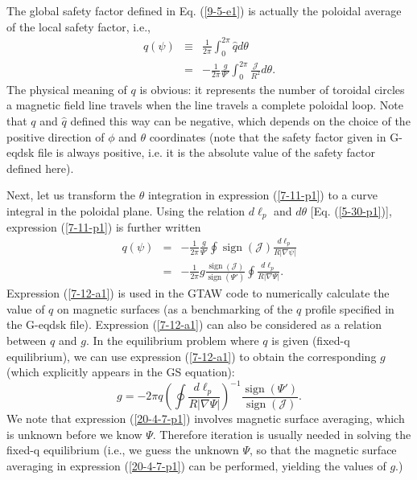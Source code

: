 \documentclass{article}
\newcommand{\tmop}[1]{\ensuremath{\operatorname{#1}}}
\begin{document}
The global safety factor defined in Eq. (\ref{9-5-e1}) is actually the
poloidal average of the local safety factor, i.e.,
\begin{eqnarray}
  q (\psi) & \equiv & \frac{1}{2 \pi} \int_0^{2 \pi} \hat{q} d \theta 
  \label{4-10-p5}\\
  & = & - \frac{1}{2 \pi}  \frac{g}{\Psi'} \int_0^{2 \pi}
  \frac{\mathcal{J}}{R^2} d \theta .  \label{7-11-p1}
\end{eqnarray}
The physical meaning of $q$ is obvious: it represents the number of toroidal
circles a magnetic field line travels when the line travels a complete
poloidal loop. Note that $q$ and $\hat{q}$ defined this way can be negative,
which depends on the choice of the positive direction of $\phi$ and $\theta$
coordinates (note that the safety factor given in G-eqdsk file is always
positive, i.e. it is the absolute value of the safety factor defined here).

Next, let us transform the $\theta$ integration in expression (\ref{7-11-p1})
to a curve integral in the poloidal plane. Using the relation $d \ell_p$ and
$d \theta$ [Eq. (\ref{5-30-p1})], expression (\ref{7-11-p1}) is further
written
\begin{eqnarray}
  q (\psi) & = & - \frac{1}{2 \pi}  \frac{g}{\Psi'} \oint \tmop{sign}
  (\mathcal{J}) \frac{d \ell_p}{R | \nabla \psi |} \nonumber\\
  & = & - \frac{1}{2 \pi} g \frac{\tmop{sign} (\mathcal{J})}{\tmop{sign}
  (\Psi')} \oint \frac{d \ell_p}{R | \nabla \Psi |} .  \label{7-12-a1}
\end{eqnarray}
Expression (\ref{7-12-a1}) is used in the GTAW code to numerically calculate
the value of $q$ on magnetic surfaces (as a benchmarking of the $q$ profile
specified in the G-eqdsk file). Expression (\ref{7-12-a1}) can also be
considered as a relation between $q$ and $g$. In the equilibrium problem where
$q$ is given (fixed-q equilibrium), we can use expression (\ref{7-12-a1}) to
obtain the corresponding $g$ (which explicitly appears in the GS equation):
\begin{equation}
  \label{20-4-7-p1} g = - 2 \pi q \left( \oint \frac{d \ell_p}{R| \nabla \Psi
  |} \right)^{- 1} \frac{\tmop{sign} (\Psi')}{\tmop{sign} (\mathcal{J})} .
\end{equation}
We note that expression (\ref{20-4-7-p1}) involves magnetic surface averaging,
which is unknown before we know $\Psi$. Therefore iteration is usually needed
in solving the fixed-q equilibrium (i.e., we guess the unknown $\Psi$, so that
the magnetic surface averaging in expression (\ref{20-4-7-p1}) can be
performed, yielding the values of $g$.)
\end{document}
